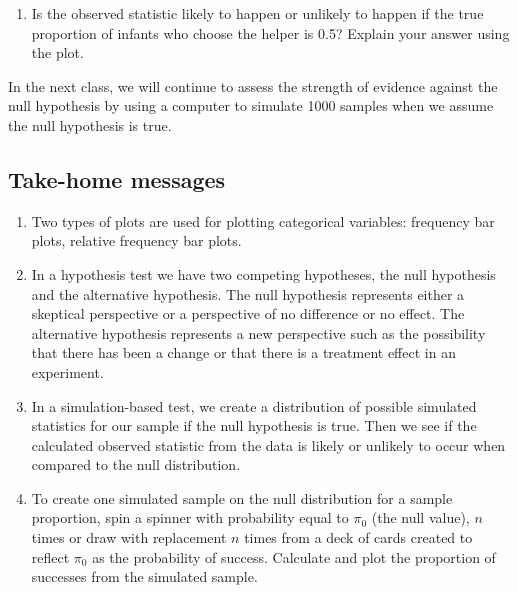 \documentclass[
]{report}
\providecommand{\tightlist}{%
  \setlength{\itemsep}{0pt}\setlength{\parskip}{0pt}}
\begin{document}
\vspace{0.2in}

\begin{enumerate}
\def\labelenumi{\arabic{enumi}.}
\setcounter{enumi}{14}
\tightlist
\item
  Is the observed statistic likely to happen or unlikely to happen if the true proportion of infants who choose the helper is 0.5? Explain your answer using the plot.
\end{enumerate}

\vspace{0.8in}

In the next class, we will continue to assess the strength of evidence against the null hypothesis by using a computer to simulate 1000 samples when we assume the null hypothesis is true.

\subsection{Take-home messages}\label{take-home-messages-5}

\begin{enumerate}
\def\labelenumi{\arabic{enumi}.}
\item
  Two types of plots are used for plotting categorical variables: frequency bar plots, relative frequency bar plots.
\item
  In a hypothesis test we have two competing hypotheses, the null hypothesis and the alternative hypothesis. The null hypothesis represents either a skeptical perspective or a perspective of no difference or no effect. The alternative hypothesis represents a new perspective such as the possibility that there has been a change or that there is a treatment effect in an experiment.
\item
  In a simulation-based test, we create a distribution of possible simulated statistics for our sample if the null hypothesis is true. Then we see if the calculated observed statistic from the data is likely or unlikely to occur when compared to the null distribution.
\item
  To create one simulated sample on the null distribution for a sample proportion, spin a spinner with probability equal to \(\pi_0\) (the null value), \(n\) times or draw with replacement \(n\) times from a deck of cards created to reflect \(\pi_0\) as the probability of success. Calculate and plot the proportion of successes from the simulated sample.
\end{enumerate}
\end{document}
